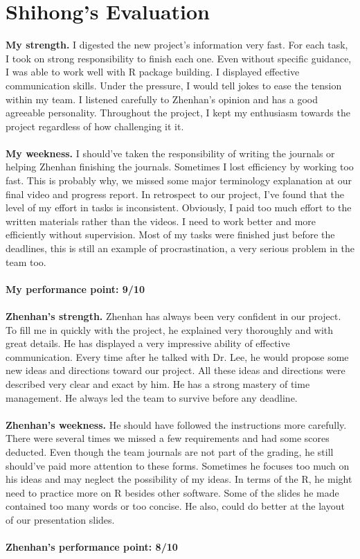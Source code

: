 \documentclass[12pt,letterpaper]{article}
\theoremstyle{definition}
\begin{document}
\section{Shihong's Evaluation}
 {\bf My strength.} I digested the new project's information very fast. For each task, I took on strong responsibility to finish each one. Even without specific guidance, I was able to work well with R package building. I displayed effective communication skills. Under the pressure, I would tell jokes to ease the tension within my team. I listened carefully to Zhenhan's opinion and has a good agreeable personality. Throughout the project,  I kept my enthusiasm towards the project regardless of how challenging it it. \\
\vspace{1 mm}
\noindent  \\
 {\bf My weekness.} I should've taken the responsibility of writing the journals or helping Zhenhan finishing the journals. Sometimes I lost efficiency by working too fast. This is probably why, we missed some major terminology explanation at our final video and progress report. In retrospect to our project, I've found that the level of my effort in tasks is inconsistent. Obviously, I paid too much effort to the written materials rather than the videos. I need to work better and more efficiently without supervision. Most of my tasks were finished just before the deadlines, this is still an example of procrastination, a very serious problem in the team too. \\
\vspace{1 mm}
\noindent  \\
{\bf My performance point: 9/10}\\
\vspace{5 mm}
\noindent  \\
 {\bf Zhenhan's strength.} Zhenhan has always  been very confident in our project. To fill me in quickly with the project, he explained very thoroughly and with great details. He has displayed a very impressive ability of effective communication. Every time after he talked with Dr. Lee, he would propose some new ideas and directions toward our project. All these ideas and directions were described very clear and exact by him. He has a strong mastery of time management. He always led the team to survive before any deadline. \\
\vspace{1 mm}
\noindent  \\
{\bf Zhenhan's weekness.}  He should have followed the instructions more carefully. There were several times we missed a few requirements and had some scores deducted. Even though the team journals are not part of the grading, he still should've paid more attention to these forms. Sometimes he focuses too much on his ideas and may neglect the possibility of my ideas. In terms of the R, he might need to practice more on R besides other software. Some of the slides he made contained too many words or too concise. He also, could do better at the layout of our presentation slides. \\
\vspace{1 mm}
\noindent  \\
{\bf Zhenhan's performance point: 8/10}\\
\end{document}

